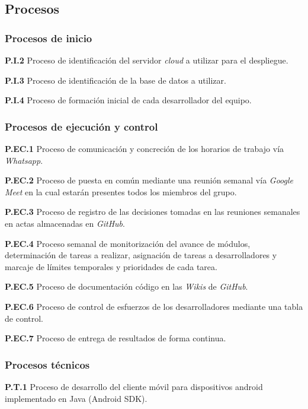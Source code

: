 \documentclass{article}
\begin{document}
\subsection{Procesos}
 
\subsubsection{Procesos de inicio}
 
\textbf{P.I.2} Proceso de identificación del servidor \textit{cloud} a utilizar para el despliegue.
 
\textbf{P.I.3} Proceso de identificación de la base de datos a utilizar.
 
\textbf{P.I.4} Proceso de formación inicial de cada desarrollador del equipo.
 
\subsubsection{Procesos de ejecución y control}
 
\textbf{P.EC.1} Proceso de comunicación y concreción de los horarios de trabajo vía \textit{Whatsapp}.
 
\textbf{P.EC.2} Proceso de puesta en común mediante una reunión semanal vía \textit{Google Meet} en la cual estarán presentes todos los miembros del grupo.
 
\textbf{P.EC.3} Proceso de registro de las decisiones tomadas en las reuniones semanales en actas almacenadas en \textit{GitHub}.
 
\textbf{P.EC.4} Proceso semanal de monitorización del avance de módulos, determinación de tareas a realizar, asignación de tareas a desarrolladores y marcaje de límites temporales y prioridades de cada tarea.
 
\textbf{P.EC.5} Proceso de documentación código en las \textit{Wikis} de \textit{GitHub}.
 
\textbf{P.EC.6} Proceso de control de esfuerzos de los desarrolladores mediante una tabla de control.
 
\textbf{P.EC.7} Proceso de entrega de resultados de forma continua.
 
\subsubsection{Procesos técnicos}
 
\textbf{P.T.1} Proceso de desarrollo del cliente móvil para dispositivos android implementado en Java (Android SDK).
 
\end{document}
